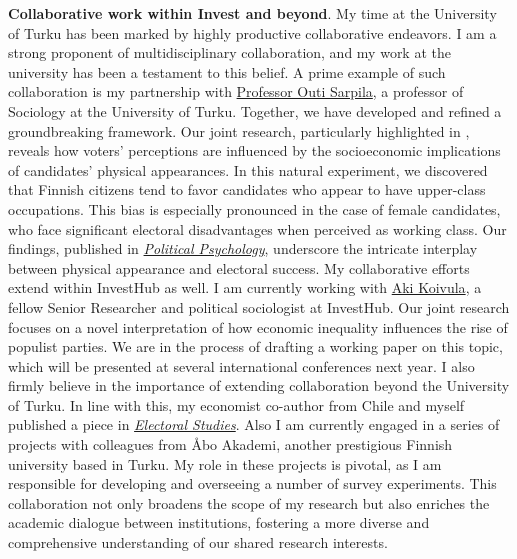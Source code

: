 \documentclass[10pt,stdletter,dateno,sigleft]{newlfm} %
\begin{document}
\begin{newlfm}
{\bf Collaborative work within Invest and beyond}. My time at the University of Turku has been marked by highly productive collaborative endeavors. I am a strong proponent of multidisciplinary collaboration, and my work at the university has been a testament to this belief. A prime example of such collaboration is my partnership with \href{https://www.utu.fi/en/people/outi-sarpila Outi Sarpila}{Professor Outi Sarpila}, a professor of Sociology at the University of Turku. Together, we have developed and refined a groundbreaking framework. Our joint research, particularly highlighted in \textcite{Bahamonde:2023}, reveals how voters' perceptions are influenced by the socioeconomic implications of candidates' physical appearances. In this natural experiment, we discovered that Finnish citizens tend to favor candidates who appear to have upper-class occupations. This bias is especially pronounced in the case of female candidates, who face significant electoral disadvantages when perceived as working class. Our findings, published in \href{https://www.scimagojr.com/journalrank.php?category=3320}{\emph{Political Psychology}}, underscore the intricate interplay between physical appearance and electoral success. My collaborative efforts extend within InvestHub as well. I am currently working with \href{https://www.utu.fi/en/people/aki-koivula}{Aki Koivula}, a fellow Senior Researcher and political sociologist at InvestHub. Our joint research focuses on a novel interpretation of how economic inequality influences the rise of populist parties. We are in the process of drafting a working paper on this topic, which will be presented at several international conferences next year. I also firmly believe in the importance of extending collaboration beyond the University of Turku. In line with this, my economist co-author from Chile and myself published a piece in \href{https://doi.org/10.1016/j.electstud.2022.102497}{\emph{Electoral Studies}}. Also I  am currently engaged in a series of projects with colleagues from \AA bo Akademi, another prestigious Finnish university based in Turku. My role in these projects is pivotal, as I am responsible for developing and overseeing a number of survey experiments. This collaboration not only broadens the scope of my research but also enriches the academic dialogue between institutions, fostering a more diverse and comprehensive understanding of our shared research interests.

\newpage


\end{newlfm}
\end{document}
